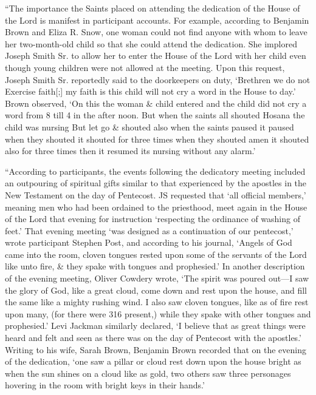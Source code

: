 			``The importance the Saints placed on attending the dedication of the House of the Lord is manifest in participant accounts. For example, according to Benjamin Brown and Eliza R. Snow, one woman could not find anyone with whom to leave her two-month-old child so that she could attend the dedication. She implored Joseph Smith Sr. to allow her to enter the House of the Lord with her child even though young children were not allowed at the meeting. Upon this request, Joseph Smith Sr. reportedly said to the doorkeepers on duty, `Brethren we do not Exercise faith[;] my faith is this child will not cry a word in the House to day.' Brown observed, `On this the woman \& child entered and the child did not cry a word from 8 till 4 in the after noon. But when the saints all shouted Hosana the child was nursing But let go \& shouted also when the saints paused it paused when they shouted it shouted for three times when they shouted amen it shouted also for three times then it resumed its nursing without any alarm.'

			``According to participants, the events following the dedicatory meeting included an outpouring of spiritual gifts similar to that experienced by the apostles in the New Testament on the day of Pentecost. JS requested that `all official members,' meaning men who had been ordained to the priesthood, meet again in the House of the Lord that evening for instruction `respecting the ordinance of washing of feet.' That evening meeting `was designed as a continuation of our pentecost,' wrote participant Stephen Post, and according to his journal, `Angels of God came into the room, cloven tongues rested upon some of the servants of the Lord like unto fire, \& they spake with tongues and prophesied.' In another description of the evening meeting, Oliver Cowdery wrote, `The spirit was poured out---I saw the glory of God, like a great cloud, come down and rest upon the house, and fill the same like a mighty rushing wind. I also saw cloven tongues, like as of fire rest upon many, (for there were 316 present,) while they spake with other tongues and prophesied.' Levi Jackman similarly declared, `I believe that as great things were heard and felt and seen as there was on the day of Pentecost with the apostles.' Writing to his wife, Sarah Brown, Benjamin Brown recorded that on the evening of the dedication, `one saw a pillar or cloud rest down upon the house bright as when the sun shines on a cloud like as gold, two others saw three personages hovering in the room with bright keys in their hands.'

